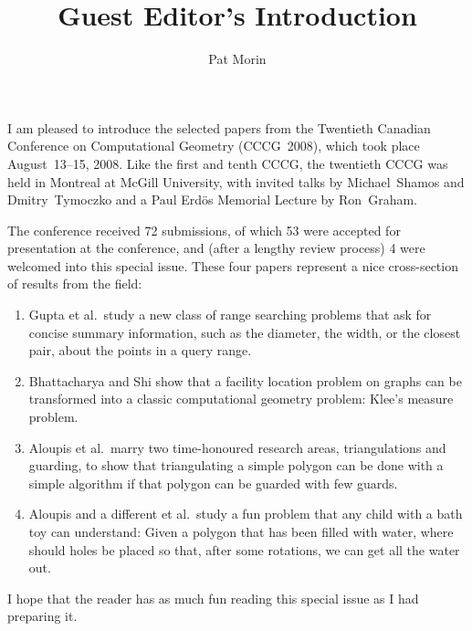 \documentclass[12pt]{elsarticle}
\newcommand{\etal}{et al.}
\begin{document}
\begin{frontmatter}
\title{Guest Editor's Introduction}
\author{Pat Morin}
\end{frontmatter}

I am pleased to introduce the selected papers from the Twentieth Canadian
Conference on Computational Geometry (CCCG~2008), which took place
August~13--15, 2008.    Like the first and tenth CCCG, the twentieth
CCCG was held in Montreal at McGill University, with invited talks by
Michael~Shamos and Dmitry~Tymoczko and a Paul Erd\"os Memorial Lecture
by Ron~Graham.

The conference received 72 submissions, of which 53 were accepted for
presentation at the conference, and (after a lengthy review process)
4 were welcomed into this special issue.  These four papers represent
a nice cross-section of results from the field:

\begin{enumerate}
\item Gupta \etal\ study a new class of range searching problems that
ask for concise summary information, such as the diameter, the width,
or the closest pair, about the points in a query range.

\item Bhattacharya and Shi show that a facility location problem on
graphs can be transformed into a classic computational geometry problem:
Klee's measure problem.

\item Aloupis \etal\ marry two time-honoured research areas, triangulations and guarding, to show that triangulating a simple polygon can be done with a simple algorithm if that polygon can be guarded with few guards.

\item Aloupis and a different \etal\ study a fun problem that any child with a bath toy can understand:  Given a polygon that has been filled with water, where should holes be placed so that, after some rotations, we can get all the water out.
\end{enumerate}
I hope that the reader has as much fun reading this special issue as I
had preparing it.
\end{document}
